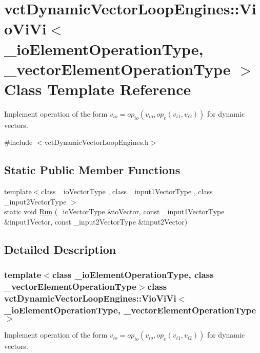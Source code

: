 \hypertarget{classvct_dynamic_vector_loop_engines_1_1_vio_vi_vi}{\section{vct\-Dynamic\-Vector\-Loop\-Engines\-:\-:Vio\-Vi\-Vi$<$ \-\_\-io\-Element\-Operation\-Type, \-\_\-vector\-Element\-Operation\-Type $>$ Class Template Reference}
\label{classvct_dynamic_vector_loop_engines_1_1_vio_vi_vi}
}


Implement operation of the form $v_{io} = op_{io}(v_{io}, op_{v}(v_{i1}, v_{i2}))$ for dynamic vectors.  




{\ttfamily \#include $<$vct\-Dynamic\-Vector\-Loop\-Engines.\-h$>$}

\subsection*{Static Public Member Functions}
\begin{DoxyCompactItemize}
\item 
{\footnotesize template$<$class \-\_\-io\-Vector\-Type , class \-\_\-input1\-Vector\-Type , class \-\_\-input2\-Vector\-Type $>$ }\\static void \hyperlink{classvct_dynamic_vector_loop_engines_1_1_vio_vi_vi_a0bbdb2a24aa1cf001c0c9aa2e25d3ca3}{Run} (\-\_\-io\-Vector\-Type \&io\-Vector, const \-\_\-input1\-Vector\-Type \&input1\-Vector, const \-\_\-input2\-Vector\-Type \&input2\-Vector)
\end{DoxyCompactItemize}


\subsection{Detailed Description}
\subsubsection*{template$<$class \-\_\-io\-Element\-Operation\-Type, class \-\_\-vector\-Element\-Operation\-Type$>$class vct\-Dynamic\-Vector\-Loop\-Engines\-::\-Vio\-Vi\-Vi$<$ \-\_\-io\-Element\-Operation\-Type, \-\_\-vector\-Element\-Operation\-Type $>$}

Implement operation of the form $v_{io} = op_{io}(v_{io}, op_{v}(v_{i1}, v_{i2}))$ for dynamic vectors. 

